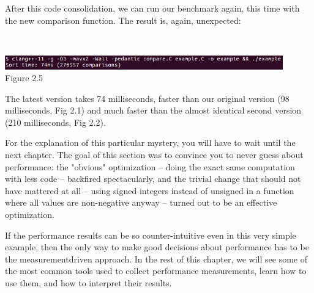 After this code consolidation, we can run our benchmark again, this time with the new comparison function. The result is, again, unexpected:

\hspace*{\fill} \\ %
\begin{center}
\includegraphics[width=0.9\textwidth]{content/1/chapter2/images/5.jpg}\\
Figure 2.5
\end{center}

The latest version takes 74 milliseconds, faster than our original version (98 milliseconds, Fig 2.1) and much faster than the almost identical second version (210 milliseconds, Fig 2.2).

For the explanation of this particular mystery, you will have to wait until the next chapter. The goal of this section was to convince you to never guess about performance: the "obvious" optimization – doing the exact same computation with less code – backfired spectacularly, and the trivial change that should not have mattered at all – using signed integers instead of unsigned in a function where all values are non-negative anyway – turned out to be an effective optimization.

If the performance results can be so counter-intuitive even in this very simple example, then the only way to make good decisions about performance has to be the measurementdriven approach. In the rest of this chapter, we will see some of the most common tools used to collect performance measurements, learn how to use them, and how to interpret their results.
